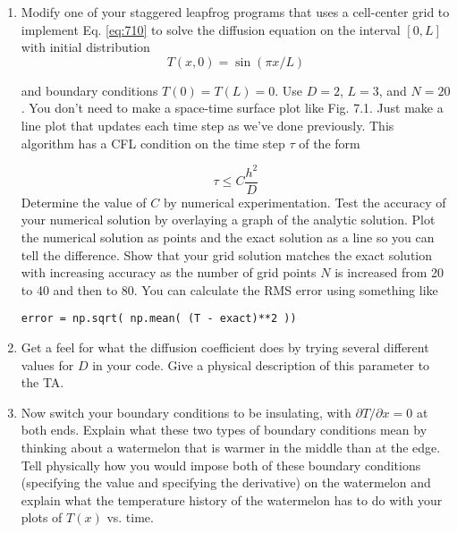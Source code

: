 \begin{problem}\label{P7.1}
\begin{enumerate}[label=(\alph*)]
\item 
Modify one of your staggered leapfrog programs that uses a cell-center
grid to implement Eq. \eqref{eq:710} to solve the diffusion equation on the
interval $[0,L]$ with initial distribution
\begin{equation}\label{eq:711}
T(x, 0)=\sin (\pi x / L)
\end{equation}

and boundary conditions $ T(0) = T (L) = 0$. Use $D = 2$, $L = 3$, and $N =
20$. You don\rq t need to make a space-time surface plot like Fig. 7.1. Just
make a line plot that updates each time step as we\rq ve done previously.
This algorithm has a CFL condition on the time step $\tau$ of the form

\begin{equation}\label{eq:712}
\tau \leq C \frac{h^{2}}{D}
\end{equation}
Determine the value of $C$ by numerical experimentation.
Test the accuracy of your numerical solution by overlaying a graph of
the analytic solution. Plot the numerical solution as points and the
exact solution as a line so you can tell the difference. Show that your
grid solution matches the exact solution with increasing accuracy as
the number of grid points $N$ is increased from 20 to 40 and then to 80.
You can calculate the RMS error using something like
\begin{lstlisting}
error = np.sqrt( np.mean( (T - exact)**2 ))
\end{lstlisting}

\item Get a feel for what the diffusion coefficient does by trying several
different values for $D$ in your code. Give a physical description of this
parameter to the TA.
\item Now switch your boundary conditions to be insulating, with $\partial T / \partial x=
0$ at both ends. Explain what these two types of boundary conditions
mean by thinking about a watermelon that is warmer in the middle
than at the edge. Tell physically how you would impose both of these
boundary conditions (specifying the value and specifying the derivative) on the watermelon and explain what the temperature history of
the watermelon has to do with your plots of $T(x)$ vs. time.
\end{enumerate}
\end{problem}
